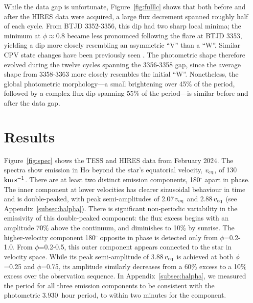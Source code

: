 \documentclass[11pt,twocolumn,tighten]{aastex7}
\newcommand{\kms}{\ensuremath{\rm km\,s^{-1}}}
\newcommand{\periodhr}{3.930}
\begin{document}
While the data gap is unfortunate, Figure~\ref{fig:fulllc} shows that
both before and after the HIRES data were acquired, a large flux
decrement spanned roughly half of each cycle.  From BTJD 3352-3356,
this dip had two sharp local minima;  the minimum at
$\phi$$\approx$0.8 became less pronounced following the flare at BTJD
3353, yielding a dip more closely resembling an asymmetric ``V'' than
a ``W''.  Similar CPV state changes have been previously seen
\citep{Stauffer2017,Bouma2024}.  The photometric shape therefore
evolved during the twelve cycles spanning the 3356-3358 gap, since the
average shape from 3358-3363 more closely resembles the initial ``W''.
Nonetheless, the global photometric morphology---a small brightening
over 45\% of the period, followed by a complex flux dip spanning 55\%
of the period---is similar before and after the data gap.


\section{Results}
\label{sec:results}

Figure~\ref{fig:spec} shows the TESS and HIRES data from February
2024.  The spectra  show emission in H$\alpha$
beyond the star's equatorial velocity, $v_{\rm eq}$, of 130\,\kms.
There are at least two distinct emission components, 180$^\circ$ apart
in phase.  The inner component at lower velocities has clearer
sinusoidal behaviour in time and is double-peaked, with peak
semi-amplitudes of 2.07\,$v_{\rm eq}$ and 2.88\,$v_{\rm eq}$ (see
Appendix~\ref{subsec:halpha}).  There is significant non-periodic
variability in the emissivity of this double-peaked component: the
flux excess begins with an amplitude 70\% above the continuum, and
diminishes to 10\% by sunrise.  The higher-velocity component
180$^\circ$ opposite in phase is detected only from $\phi$=0.2-1.0.
From $\phi$=0.2-0.5, this outer component appears connected to the
star in velocity space.  While its peak semi-amplitude of
3.88\,$v_{\rm eq}$ is achieved at both $\phi$=0.25 and $\phi$=0.75,
its amplitude similarly decreases from a 60\% excess to a 10\% excess
over the observation sequence.  In Appendix~\ref{subsec:halpha}, we
measured the period for all three emission components to be consistent
with the photometric \periodhr\ hour period, to within two minutes for
the  component.  
\end{document}
